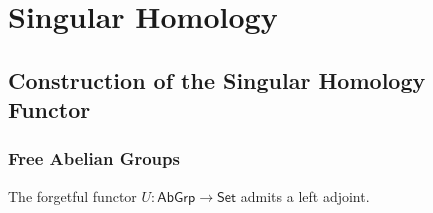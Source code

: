 \chapter{Singular Homology}
\section*{Construction of the Singular Homology Functor}
\subsection*{Free Abelian Groups}

\begin{proposition}
	The forgetful functor $U : \mathsf{AbGrp} \to \mathsf{Set}$ admits a left adjoint.
	\label{prop:F_set_abgrp}
\end{proposition}

